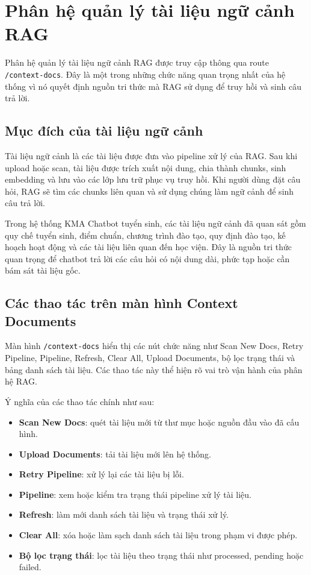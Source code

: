 \section{Phân hệ quản lý tài liệu ngữ cảnh RAG}

Phân hệ quản lý tài liệu ngữ cảnh RAG được truy cập thông qua route \texttt{/context-docs}. Đây là một trong những chức năng quan trọng nhất của hệ thống vì nó quyết định nguồn tri thức mà RAG sử dụng để truy hồi và sinh câu trả lời.

\subsection{Mục đích của tài liệu ngữ cảnh}

Tài liệu ngữ cảnh là các tài liệu được đưa vào pipeline xử lý của RAG. Sau khi upload hoặc scan, tài liệu được trích xuất nội dung, chia thành chunks, sinh embedding và lưu vào các lớp lưu trữ phục vụ truy hồi. Khi người dùng đặt câu hỏi, RAG sẽ tìm các chunks liên quan và sử dụng chúng làm ngữ cảnh để sinh câu trả lời.

Trong hệ thống KMA Chatbot tuyển sinh, các tài liệu ngữ cảnh đã quan sát gồm quy chế tuyển sinh, điểm chuẩn, chương trình đào tạo, quy định đào tạo, kế hoạch hoạt động và các tài liệu liên quan đến học viện. Đây là nguồn tri thức quan trọng để chatbot trả lời các câu hỏi có nội dung dài, phức tạp hoặc cần bám sát tài liệu gốc.

\subsection{Các thao tác trên màn hình Context Documents}

Màn hình \texttt{/context-docs} hiển thị các nút chức năng như Scan New Docs, Retry Pipeline, Pipeline, Refresh, Clear All, Upload Documents, bộ lọc trạng thái và bảng danh sách tài liệu. Các thao tác này thể hiện rõ vai trò vận hành của phân hệ RAG.

Ý nghĩa của các thao tác chính như sau:

\begin{itemize}
    \item \textbf{Scan New Docs}: quét tài liệu mới từ thư mục hoặc nguồn đầu vào đã cấu hình.
    \item \textbf{Upload Documents}: tải tài liệu mới lên hệ thống.
    \item \textbf{Retry Pipeline}: xử lý lại các tài liệu bị lỗi.
    \item \textbf{Pipeline}: xem hoặc kiểm tra trạng thái pipeline xử lý tài liệu.
    \item \textbf{Refresh}: làm mới danh sách tài liệu và trạng thái xử lý.
    \item \textbf{Clear All}: xóa hoặc làm sạch danh sách tài liệu trong phạm vi được phép.
    \item \textbf{Bộ lọc trạng thái}: lọc tài liệu theo trạng thái như processed, pending hoặc failed.
\end{itemize}

